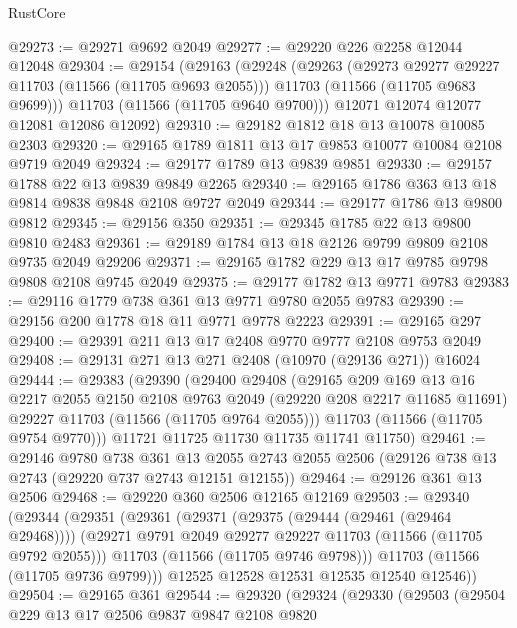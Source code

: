 \begin{lexlean}{RustCore}
\begin{coremodule}
@29273 := @29271 @9692 @2049
@29277 := @29220 @226 @2258 @12044 @12048
@29304 := @29154
    (@29163
      (@29248
        (@29263
          (@29273 @29277 @29227 @11703 (@11566 (@11705 @9693 @2055)))
          @11703
          (@11566 (@11705 @9683 @9699)))
        @11703
        (@11566 (@11705 @9640 @9700)))
      @12071
      @12074
      @12077
      @12081
      @12086
      @12092)
@29310 := @29182 @1812 @18 @13 @10078 @10085 @2303
@29320 := @29165 @1789 @1811 @13 @17 @9853 @10077 @10084 @2108 @9719 @2049
@29324 := @29177 @1789 @13 @9839 @9851
@29330 := @29157 @1788 @22 @13 @9839 @9849 @2265
@29340 := @29165 @1786 @363 @13 @18 @9814 @9838 @9848 @2108 @9727 @2049
@29344 := @29177 @1786 @13 @9800 @9812
@29345 := @29156 @350
@29351 := @29345 @1785 @22 @13 @9800 @9810 @2483
@29361 := @29189 @1784 @13 @18 @2126 @9799 @9809 @2108 @9735 @2049 @29206
@29371 := @29165 @1782 @229 @13 @17 @9785 @9798 @9808 @2108 @9745 @2049
@29375 := @29177 @1782 @13 @9771 @9783
@29383 := @29116 @1779 @738 @361 @13 @9771 @9780 @2055 @9783
@29390 := @29156 @200 @1778 @18 @11 @9771 @9778 @2223
@29391 := @29165 @297
@29400 := @29391 @211 @13 @17 @2408 @9770 @9777 @2108 @9753 @2049
@29408 := @29131 @271 @13 @271 @2408 (@10970 (@29136 @271)) @16024
@29444 := @29383
    (@29390
      (@29400
        @29408
        (@29165
          @209
          @169
          @13
          @16
          @2217
          @2055
          @2150
          @2108
          @9763
          @2049
          (@29220 @208 @2217 @11685 @11691)
          @29227
          @11703
          (@11566 (@11705 @9764 @2055)))
        @11703
        (@11566 (@11705 @9754 @9770)))
      @11721
      @11725
      @11730
      @11735
      @11741
      @11750)
@29461 := @29146
    @9780
    @738
    @361
    @13
    @2055
    @2743
    @2055
    @2506
    (@29126 @738 @13 @2743 (@29220 @737 @2743 @12151 @12155))
@29464 := @29126 @361 @13 @2506
@29468 := @29220 @360 @2506 @12165 @12169
@29503 := @29340
    (@29344
      (@29351
        (@29361
          (@29371
            (@29375 (@29444 (@29461 (@29464 @29468))))
            (@29271 @9791 @2049 @29277 @29227 @11703 (@11566 (@11705 @9792 @2055)))
            @11703
            (@11566 (@11705 @9746 @9798)))
          @11703
          (@11566 (@11705 @9736 @9799)))
        @12525
        @12528
        @12531
        @12535
        @12540
        @12546))
@29504 := @29165 @361
@29544 := @29320
    (@29324
      (@29330
        (@29503
          (@29504
            @229
            @13
            @17
            @2506
            @9837
            @9847
            @2108
            @9820

\end{coremodule}
\end{lexlean}
